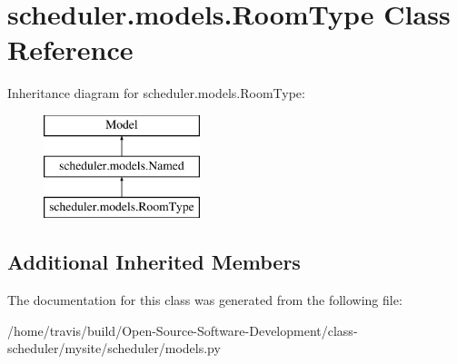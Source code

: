 \hypertarget{classscheduler_1_1models_1_1_room_type}{\section{scheduler.\-models.\-Room\-Type Class Reference}
\label{classscheduler_1_1models_1_1_room_type}
}
Inheritance diagram for scheduler.\-models.\-Room\-Type\-:\begin{figure}[H]
\begin{center}
\leavevmode
\includegraphics[height=3.000000cm]{classscheduler_1_1models_1_1_room_type}
\end{center}
\end{figure}
\subsection*{Additional Inherited Members}


The documentation for this class was generated from the following file\-:\begin{DoxyCompactItemize}
\item 
/home/travis/build/\-Open-\/\-Source-\/\-Software-\/\-Development/class-\/scheduler/mysite/scheduler/models.\-py\end{DoxyCompactItemize}
